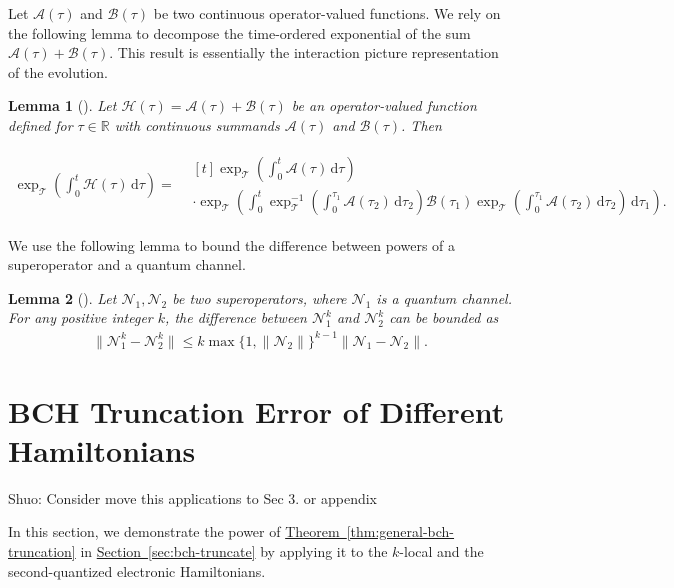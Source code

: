 \documentclass[aps,pra,reprint,groupedaddress,floatfix]{revtex4-2}
\newtheorem{lemma}{Lemma}
\newcommand{\thm}[1]{\hyperref[thm:#1]{Theorem~\ref*{thm:#1}}}
\renewcommand{\sec}[1]{\hyperref[sec:#1]{Section~\ref*{sec:#1}}}
\renewcommand{\d}{\mathrm{d}}
\newcommand{\mc}{\mathcal}
\newcommand{\sz}[1]{{\color{blue} Shuo: #1}}
\begin{document}
Let $\mc A(\tau)$ and $\mc B(\tau)$ be two continuous operator-valued functions. We rely on the following lemma to decompose the time-ordered exponential of the sum $\mc A(\tau) + \mc B(\tau)$. This result is essentially the interaction picture representation of the evolution.
\begin{lemma}[{\cite[Page 21]{dollard1984product}}]
\label{lem:interaction-pic}
    Let $\mc H(\tau) = \mc A(\tau) + \mc B(\tau)$ be an operator-valued function defined for $\tau \in \mathbb{R}$ with continuous summands $\mc A(\tau)$ and $\mc B(\tau)$. Then
    \begin{widetext}
    \begin{align*}
    \exp_{\mc T}\left(\int_{0}^{t}  \mc H(\tau)\, \d \tau\right)
    ={}&  \begin{multlined}[t]
        \exp_{\mc T}\left(\int_{0}^{t}  \mc A(\tau)\, \d \tau\right) \\
     \cdot \exp_{\mc T}\left(\int_{0}^{t}\exp_{\mc T}^{-1}\left(\int_{0}^{\tau_1}  \mc A(\tau_2)\, \d \tau_2\right)\mc  B(\tau_1) \exp_{\mc T}\left(\int_{0}^{\tau_1}\mc  A(\tau_2)\, \d \tau_2\right)\, \d \tau_1\right).
    \end{multlined}
    \end{align*}
    \end{widetext}
\end{lemma} 
We use the following lemma to bound the difference between powers of a superoperator and a quantum channel. 
\begin{lemma}[{\cite[Lemma~3]{wang2026lindbladiansimulationcommutatorbounds}}]
\label{lem:power-bound}
    Let $\mc N_1, \mc N_2$ be two superoperators, where $\mc N_1$ is a quantum channel. For any positive integer $k$, the difference between $\mc N_1^k$ and $\mc N_2^{k}$ can be bounded as
    \begin{align*}
        \|\mc N_1^k-\mc N_2^k\| \le k \max\{1, \|\mc N_2\|\}^{k-1} \|\mc N_1-\mc N_2\|.
    \end{align*}
\end{lemma}

\section{BCH Truncation Error of Different Hamiltonians}\label{append:BCH}
\sz{Consider move this applications to Sec 3. or appendix}

In this section, we demonstrate the power of \thm{general-bch-truncation} in \sec{bch-truncate} by applying it to the $k$-local and the second-quantized electronic Hamiltonians.
\end{document}
